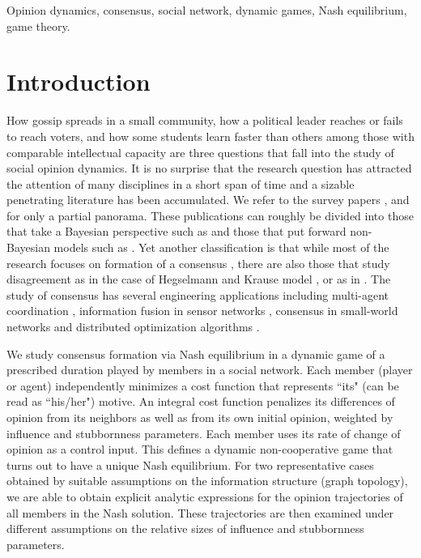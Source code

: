 \documentclass[10pt, conference, compsocconf]{IEEEtran}
\begin{document}
%
\IEEEpeerreviewmaketitle

\vspace{0.25cm}
\begin{IEEEkeywords}

Opinion dynamics, consensus, social network, dynamic games, Nash equilibrium, game theory.

\end{IEEEkeywords}


\section{Introduction}

How gossip  spreads in a small community, how a political leader reaches or fails to reach voters, and how some students learn faster than others among those with comparable intellectual capacity are three questions that fall into the study of social opinion dynamics. It is no surprise that the research question has attracted the attention of many disciplines in a short span of time and a sizable penetrating literature has been accumulated. We refer to the survey papers \cite{ozdaglar}, \cite{albi} and \cite{olfati} for only a partial panorama. These publications can roughly be divided into those that take a Bayesian perspective such as \cite{welch} and those that put forward non-Bayesian models such as \cite{degroot}. Yet another classification is that while most of the research focuses on formation of a consensus \cite{tsitsiklis}, there are also those that study disagreement as in the case of Hegselmann and Krause model \cite{krause}, \cite{etesami} or as in \cite{bindel}. The study of consensus has several engineering applications including multi-agent coordination \cite{ren}, information fusion in sensor networks \cite{boyd}, consensus in small-world networks \cite{olfati2} and distributed optimization algorithms \cite{tsianos}.
 
We study consensus formation via Nash equilibrium in a dynamic game of a prescribed duration played by members in a social network. Each member (player or agent) independently minimizes a cost function that represents ``its" (can be read as ``his/her") motive. An integral cost function penalizes its differences of opinion from its neighbors as well as from its own initial opinion, weighted by influence and stubbornness parameters.  Each member uses its rate of change of opinion as a control input. 
This defines a dynamic non-cooperative game that turns out to have a unique Nash equilibrium. For two representative cases obtained by suitable assumptions on the information structure (graph topology), we are  able to obtain 
explicit analytic expressions for the opinion trajectories of all members in the Nash solution. These trajectories are then examined under different assumptions on the relative sizes of influence and stubbornness parameters.    
    
\end{document}
